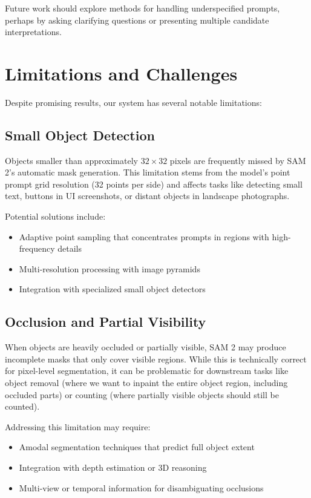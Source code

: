 Future work should explore methods for handling underspecified prompts, perhaps by asking clarifying questions or presenting multiple candidate interpretations.

\section{Limitations and Challenges}

Despite promising results, our system has several notable limitations:

\subsection{Small Object Detection}

Objects smaller than approximately $32 \times 32$ pixels are frequently missed by SAM 2's automatic mask generation. This limitation stems from the model's point prompt grid resolution (32 points per side) and affects tasks like detecting small text, buttons in UI screenshots, or distant objects in landscape photographs.

Potential solutions include:
\begin{itemize}
    \item Adaptive point sampling that concentrates prompts in regions with high-frequency details
    \item Multi-resolution processing with image pyramids
    \item Integration with specialized small object detectors
\end{itemize}

\subsection{Occlusion and Partial Visibility}

When objects are heavily occluded or partially visible, SAM 2 may produce incomplete masks that only cover visible regions. While this is technically correct for pixel-level segmentation, it can be problematic for downstream tasks like object removal (where we want to inpaint the entire object region, including occluded parts) or counting (where partially visible objects should still be counted).

Addressing this limitation may require:
\begin{itemize}
    \item Amodal segmentation techniques that predict full object extent
    \item Integration with depth estimation or 3D reasoning
    \item Multi-view or temporal information for disambiguating occlusions
\end{itemize}

